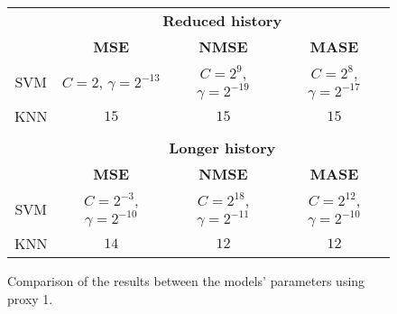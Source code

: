 \begin{figure}[!h]
\centering
\begin{tabular}{|c|c|c|c|}
\hline
    & \multicolumn{3}{|c|}{\textbf{Reduced history}} \\ \cline{2-4}
    & \textbf{MSE} & \textbf{NMSE} & \textbf{MASE}          \\ \hline
    SVM  & $C = 2$, $\gamma = 2^{-13}$&  $C = 2^9$, $\gamma = 2^{-19}$& $C = 2^8$, $\gamma = 2^{-17}$ \\ 
    KNN & $15$ &$15$ &$15$         \\ 
    \hline
\multicolumn{4}{c}{\textbf{}} \\ \cline{1-4}
    & \multicolumn{3}{|c|}{\textbf{Longer history}} \\ \cline{2-4}
    & \textbf{MSE} & \textbf{NMSE} & \textbf{MASE}          \\ \hline
    SVM  & $C = 2^{-3}$, $\gamma = 2^{-10}$  & $C = 2^{18}$, $\gamma = 2^{-11}$&  $C = 2^{12}$, $\gamma = 2^{-10}$ \\ 
    KNN & $14$ &$12$ &$12$         \\ \hline
\end{tabular}
\caption{Comparison of the results between the models' parameters using proxy 1.}
\label{fig:comparep1}
\end{figure}